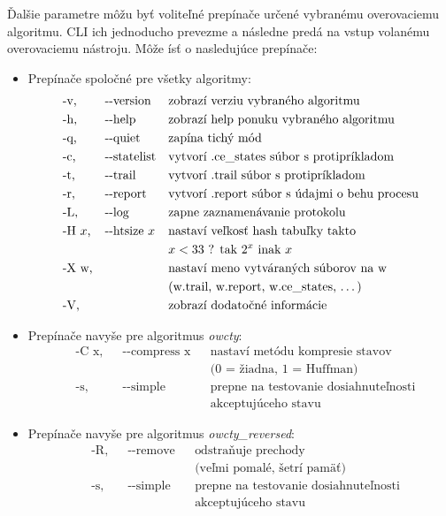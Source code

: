 \documentclass[11pt,final,oneside]{fithesis}
\begin{document}
\v Dal\v sie parametre m\^ o\v zu by\v t volite\v ln\'e prep\'ina\v ce ur\v cen\'e vybran\'emu overovaciemu algoritmu. CLI ich jednoducho prevezme a n\'asledne 
pred\'a na vstup volan\'emu overovaciemu n\'astroju. M\^ o\v ze \'is\v t o nasleduj\'uce prep\'ina\v ce:
\begin{itemize}
\item Prep\'ina\v ce spolo\v cn\'e pre v\v setky algoritmy:
	\begin{align*}
	&\textrm{-v,}& &\textrm{{-}{-}version}& &\textrm{zobraz\'i verziu vybran\'eho algoritmu}\\
	&\textrm{-h,}& &\textrm{{-}{-}help}& &\textrm{zobraz\'i help ponuku vybran\'eho algoritmu}\\
	&\textrm{-q,}& &\textrm{{-}{-}quiet}& &\textrm{zap\'ina tich\'y m\'od}\\
	&\textrm{-c,}& &\textrm{{-}{-}statelist}& &\textrm{vytvor\'i .ce\_states s\'ubor s protipr\'ikladom}\\
	&\textrm{-t,}& &\textrm{{-}{-}trail}& &\textrm{vytvor\'i .trail s\'ubor s protipr\'ikladom}\\
	&\textrm{-r,}& &\textrm{{-}{-}report}& &\textrm{vytvor\'i .report s\'ubor s \'udajmi o behu procesu}\\
	&\textrm{-L,}& &\textrm{{-}{-}log}& &\textrm{zapne zaznamen\'avanie protokolu}\\
	&\textrm{-H } x\textrm{,}& &\textrm{{-}{-}htsize } x& &\textrm{nastav\'i ve\v lkos\v t hash tabu\v lky takto}\\
	& & & & &x < 33 \textrm{ ? tak } 2^x \textrm{ inak } x\\
	&\textrm{-X w,}& & & &\textrm{nastav\'i meno vytv\'aran\'ych s\'uborov na w}\\
	& & & & &\textrm{(w.trail, w.report, w.ce\_states, \dots{})}\\
	&\textrm{-V,}& & & &\textrm{zobraz\'i dodato\v cn\'e inform\'acie}
	\end{align*}
\item Prep\'ina\v ce navy\v se pre algoritmus {\it owcty}:
	\begin{align*}
	&\textrm{-C x,}& &\textrm{{-}{-}compress x}& &\textrm{nastav\'i met\'odu kompresie stavov}\\
	& & & & &\textrm{(0 = \v ziadna, 1 = Huffman)}\\
	&\textrm{-s,}& &\textrm{{-}{-}simple}& &\textrm{prepne na testovanie dosiahnute\v lnosti}\\
	& & & & &\textrm{akceptuj\'uceho stavu}
	\end{align*}
\item Prep\'ina\v ce navy\v se pre algoritmus {\it owcty\_reversed}:
	\begin{align*}
	&\textrm{-R,}& &\textrm{{-}{-}remove}& &\textrm{odstra\v nuje prechody }\\
	& & & & &\textrm{(ve\v lmi pomal\'e, \v setr\'i pam\"a\v t)}\\
	&\textrm{-s,}& &\textrm{{-}{-}simple}& &\textrm{prepne na testovanie dosiahnute\v lnosti}\\
	& & & & &\textrm{akceptuj\'uceho stavu}
	\end{align*}
\end{itemize}
\end{document}
